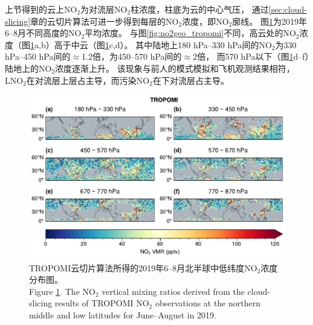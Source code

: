 上节得到的云上NO$_2$为对流层NO$_2$柱浓度，柱底为云的中心气压，
通过\ref{sec:cloud-slicing}章的云切片算法可进一步得到每层的NO$_2$浓度，即NO$_2$廓线。
图\ref{fig:utno2_tropomi}为2019年6--8月不同高度的NO$_2$平均浓度。
与图\ref{fig:no2geo_tropomi}不同，高云处的NO$_2$浓度（图\ref{fig:utno2_tropomi}a,b）高于中云（图\ref{fig:utno2_tropomi}c,d）。
其中陆地上180 hPa--330 hPa间的NO$_2$为330 hPa--450 hPa间的$\approx$1.2倍，为450--570 hPa间的$\approx$2倍，
而570 hPa以下（图\ref{fig:utno2_tropomi}d--f）陆地上的NO$_2$浓度逐渐上升。
该现象与前人的模式模拟和飞机观测结果相符，LNO$_2$在对流层上层占主导，而污染NO$_2$在下对流层占主导\citep{Pickering.1996,Ott.2010,Laughner.2017}。


\begin{figure}[!htbp]
    \centering
    \includegraphics[width=14cm]{./figures/utno2_tropomi.pdf}
    \caption{
    TROPOMI云切片算法所得的2019年6--8月北半球中低纬度NO$_2$浓度分布图。 \\
    Figure \ref{fig:utno2_tropomi}. The NO$_2$ vertical mixing ratios derived from the cloud-slicing results of TROPOMI NO$_2$ observations at the northern middle and low latitudes for June--August in 2019.
    }
    \label{fig:utno2_tropomi}
\end{figure}

